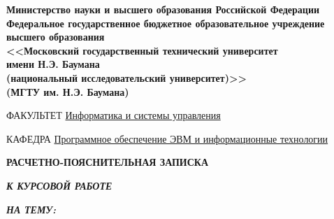     \thispagestyle{empty}

    \noindent\begin{minipage}{0.05\textwidth}
        
    \end{minipage}
    \hfill
    \begin{minipage}{0.85\textwidth}\raggedleft
        \begin{center}
            \fontsize{12pt}{0.3\baselineskip}\selectfont \textbf{Министерство науки и высшего образования Российской Федерации \\ Федеральное государственное бюджетное образовательное учреждение \\ высшего образования \\ <<Московский государственный технический университет \\ имени Н.Э. Баумана \\ (национальный исследовательский университет)>> \\ (МГТУ им. Н.Э. Баумана)}
        \end{center}
    \end{minipage}

    \begin{center}
        \fontsize{12pt}{0.1\baselineskip}\selectfont
        \noindent\makebox[\linewidth]{\rule{\textwidth}{4pt}} \makebox[\linewidth]{\rule{\textwidth}{1pt}}
    \end{center}

    \begin{flushleft}
        \fontsize{12pt}{0.8\baselineskip}\selectfont

        ФАКУЛЬТЕТ {\expandafter \uline{
            Информатика и системы управления
            \hfill}}

        КАФЕДРА \uline{\mbox{\hspace{4mm}}
            Программное обеспечение ЭВМ и информационные технологии
            \hfill}
    \end{flushleft}

    \vfill

    \begin{center}
        \fontsize{20pt}{\baselineskip}\selectfont

        \textbf{РАСЧЕТНО-ПОЯСНИТЕЛЬНАЯ ЗАПИСКА}

        \textbf{\textit{К КУРСОВОЙ РАБОТЕ}}

        \textbf{\textit{НА ТЕМУ:}}
    \end{center}

